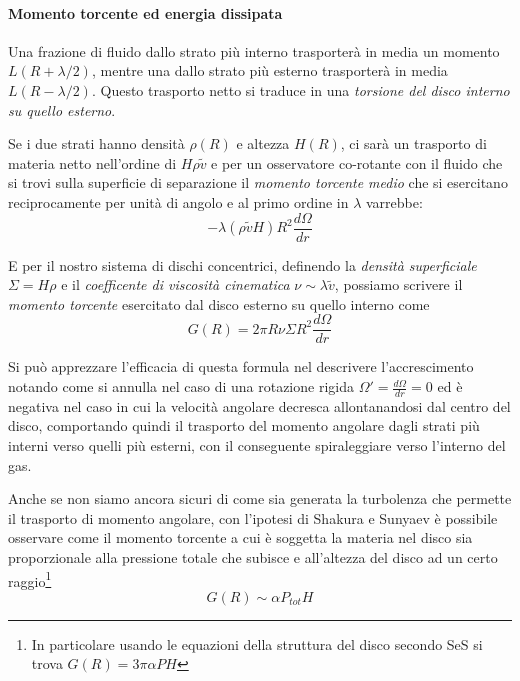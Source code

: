 \documentclass[a4paperbi]{article}
\begin{document}
	\paragraph{Momento torcente ed energia dissipata}
	Una frazione di fluido dallo strato più interno trasporterà in media un momento $L(R+\lambda/2)$, mentre una dallo strato più esterno trasporterà in media $L(R-\lambda/2)$. Questo trasporto netto si traduce in una \textit{torsione del disco interno su quello esterno}.
	
	Se i due strati hanno densità $\rho(R)$ e altezza $H(R)$, ci sarà un trasporto di materia netto nell'ordine di $H\rho\tilde{v}$ e per un osservatore co-rotante con il fluido che si trovi sulla superficie di separazione il \textit{momento torcente medio} che si esercitano reciprocamente per unità di angolo e al primo ordine in $\lambda$ varrebbe:
	\begin{equation*}
		-\lambda(\rho\tilde{v} H) R^2\frac{d\Omega}{dr}
	\end{equation*}
	
	E per il nostro sistema di dischi concentrici, definendo la \textit{densità superficiale} $\Sigma=H\rho$ e il \textit{coefficente di viscosità cinematica} $\nu\sim\lambda\tilde{v}$, possiamo scrivere il \textit{momento torcente} esercitato dal disco esterno su quello interno come
	\begin{equation}
		G(R)=2\pi R\nu\Sigma R^2\frac{d\Omega}{dr}
	\end{equation}
	
	Si può apprezzare l'efficacia di questa formula nel descrivere l'accrescimento notando come si annulla nel caso di una rotazione rigida $\Omega'=\frac{d\Omega}{dr}=0$ ed è negativa nel caso in cui la velocità angolare decresca allontanandosi dal centro del disco, comportando quindi il trasporto del momento angolare dagli strati più interni verso quelli più esterni, con il conseguente spiraleggiare verso l'interno del gas.

	Anche se non siamo ancora sicuri di come sia generata la turbolenza che permette il trasporto di momento angolare, con l'ipotesi di Shakura e Sunyaev è possibile osservare come il momento torcente a cui è soggetta la materia nel disco sia proporzionale alla pressione totale che subisce e all'altezza del disco ad un certo raggio\footnote{In particolare usando le equazioni della struttura del disco secondo SeS si trova $G(R)=3\pi\alpha PH$}
	\begin{equation}
		G(R)\sim\alpha P_{tot}H
	\end{equation}
		
\end{document}
